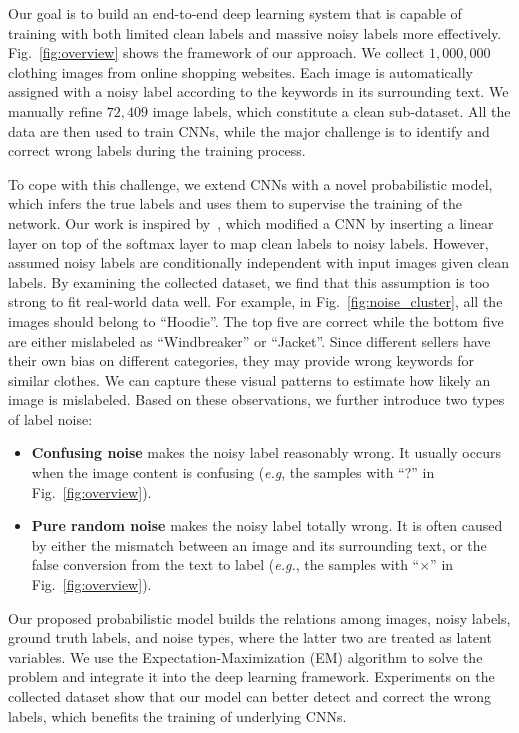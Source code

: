 \documentclass[extendedabs]{bmvc2k}
\begin{document}
Our goal is to build an end-to-end deep learning system that is capable of training with both limited clean labels and massive noisy labels more effectively. Fig.~\ref{fig:overview} shows the framework of our approach. We collect $1,000,000$ clothing images from online shopping websites. Each image is automatically assigned with a noisy label according to the keywords in its surrounding text. We manually refine $72,409$ image labels, which constitute a clean sub-dataset. All the data are then used to train CNNs, while the major challenge is to identify and correct wrong labels during the training process.

To cope with this challenge, we extend CNNs with a novel probabilistic model, which infers the true labels and uses them to supervise the training of the network. Our work is inspired by~\cite{sukhbaatar2014learning}, which modified a CNN by inserting a linear layer on top of the softmax layer to map clean labels to noisy labels. However,~\cite{sukhbaatar2014learning} assumed noisy labels are conditionally independent with input images given clean labels. By examining the collected dataset, we find that this assumption is too strong to fit real-world data well. For example, in Fig.~\ref{fig:noise_cluster}, all the images should belong to ``Hoodie''. The top five are correct while the bottom five are either mislabeled as ``Windbreaker'' or ``Jacket''. Since different sellers have their own bias on different categories, they may provide wrong keywords for similar clothes. We can capture these visual patterns to estimate how likely an image is mislabeled. Based on these observations, we further introduce two types of label noise:
\begin{itemize}
\item \textbf{Confusing noise} makes the noisy label reasonably wrong. It usually occurs when the image content is confusing (\emph{e.g}, the samples with ``?'' in Fig.~\ref{fig:overview}).
\item \textbf{Pure random noise} makes the noisy label totally wrong. It is often caused by either the mismatch between an image and its surrounding text, or the false conversion from the text to label (\emph{e.g.}, the samples with ``$\times$'' in Fig.~\ref{fig:overview}).
\end{itemize}

Our proposed probabilistic model builds the relations among images, noisy labels, ground truth labels, and noise types, where the latter two are treated as latent variables. We use the Expectation-Maximization (EM) algorithm to solve the problem and integrate it into the deep learning framework. Experiments on the collected dataset show that our model can better detect and correct the wrong labels, which benefits the training of underlying CNNs.
\end{document}
